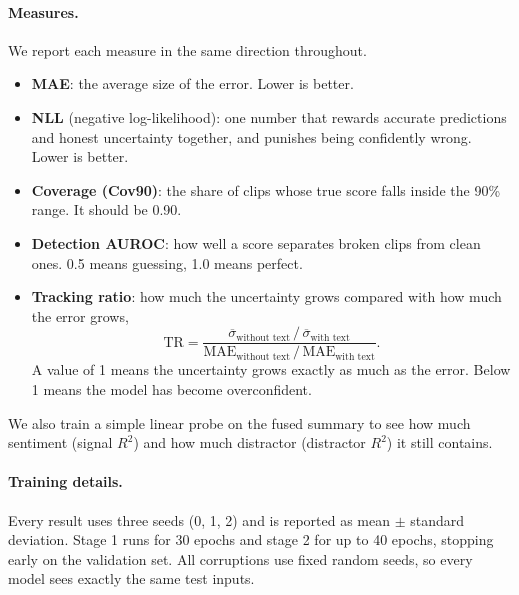 \documentclass[10pt,twocolumn]{article}
\begin{document}
\paragraph{Measures.} We report each measure in the same direction throughout.
\begin{itemize}
\item \textbf{MAE}: the average size of the error. Lower is better.
\item \textbf{NLL} (negative log-likelihood): one number that rewards accurate predictions and honest uncertainty
  together, and punishes being confidently wrong. Lower is better.
\item \textbf{Coverage (Cov90)}: the share of clips whose true score falls inside the 90\% range. It should be 0.90.
\item \textbf{Detection AUROC}: how well a score separates broken clips from clean ones. 0.5 means guessing, 1.0 means
  perfect.
\item \textbf{Tracking ratio}: how much the uncertainty grows compared with how much the error grows,
\begin{equation}
\mathrm{TR}=\frac{\overline{\sigma}_{\text{without text}}\,/\,\overline{\sigma}_{\text{with text}}}{\mathrm{MAE}_{\text{without text}}\,/\,\mathrm{MAE}_{\text{with text}}}.
\end{equation}
  A value of 1 means the uncertainty grows exactly as much as the error. Below 1 means the model has become overconfident.
\end{itemize}
We also train a simple linear probe on the fused summary to see how much sentiment (signal $R^2$) and how much distractor
(distractor $R^2$) it still contains.

\paragraph{Training details.} Every result uses three seeds (0, 1, 2) and is reported as mean $\pm$ standard
deviation. Stage 1 runs for 30 epochs and stage 2 for up to 40 epochs, stopping early on the validation set. All
corruptions use fixed random seeds, so every model sees exactly the same test inputs.

\end{document}
